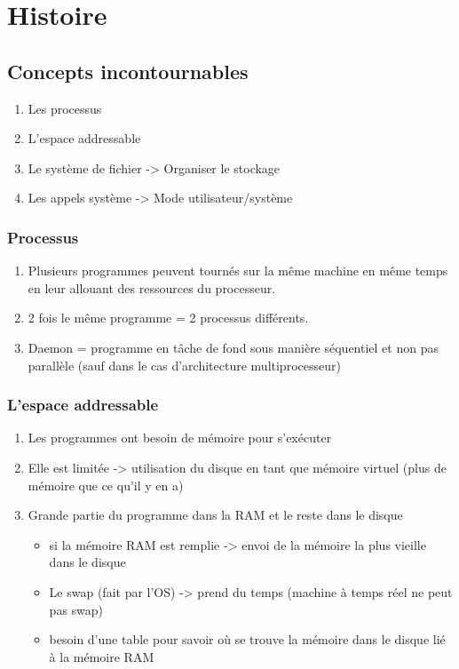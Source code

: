 \chapter{Histoire}
\section{Concepts incontournables}
\begin{enumerate}
  \item Les processus
  \item L'espace addressable
  \item Le système de fichier -> Organiser le stockage
  \item Les appels système -> Mode utilisateur/système
\end{enumerate}

\subsection{Processus}
\begin{enumerate}
  \item Plusieurs programmes peuvent tournés sur la même machine en même temps en leur allouant des ressources du processeur.
  \item 2 fois le même programme = 2 processus différents.
  \item Daemon = programme en tâche de fond sous manière séquentiel et non pas parallèle (sauf dans le cas d'architecture multiprocesseur)
\end{enumerate}

\subsection{L'espace addressable}
\begin{enumerate}
  \item Les programmes ont besoin de mémoire pour s'exécuter
  \item Elle est limitée -> utilisation du disque en tant que mémoire virtuel (plus de mémoire que ce qu'il y en a)
  \item Grande partie du programme dans la RAM et le reste dans le disque
  \begin{itemize}
    \item si la mémoire RAM est remplie -> envoi de la mémoire la plus vieille dans le disque
    \item Le swap (fait par l'OS) -> prend du temps (machine à temps réel ne peut pas swap)
    \item besoin d'une table pour savoir où se trouve la mémoire dans le disque lié à la mémoire RAM
  \end{itemize}
\end{enumerate}

